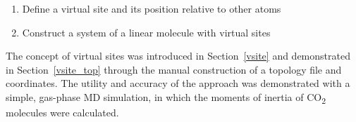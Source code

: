 \documentclass[9pt,tutorial,pubversion]{livecoms}
\begin{document}
\begin{enumerate}
	\item Define a virtual site and its position relative to other atoms
	\item Construct a system of a linear molecule with virtual sites
\end{enumerate}

The concept of virtual sites was introduced in Section~\ref{vsite} and demonstrated in Section~\ref{vsite_top} through the manual construction of a topology file and coordinates. The utility and accuracy of the approach was demonstrated with a simple, gas-phase MD simulation, in which the moments of inertia of CO\textsubscript{2} molecules were calculated.


% 
% 
% 
\end{document}
